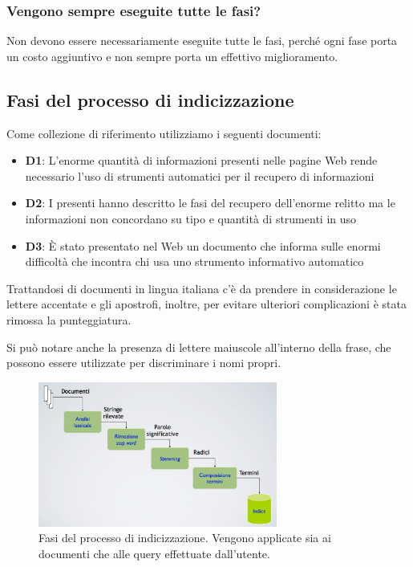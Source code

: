 


\subsubsection{Vengono sempre eseguite tutte le fasi?}

Non devono essere necessariamente eseguite tutte le fasi, perché ogni fase porta un costo aggiuntivo e non sempre porta un effettivo miglioramento.

\subsection{Fasi del processo di indicizzazione}

Come collezione di riferimento utilizziamo i seguenti documenti:

\begin{itemize}
	\item \textbf{D1}: L’enorme quantità di informazioni presenti nelle pagine Web rende necessario l’uso di strumenti automatici per il recupero di informazioni
	\item \textbf{D2}: I presenti hanno descritto le fasi del recupero dell’enorme relitto ma le informazioni non concordano su tipo e quantità di strumenti in uso
	\item \textbf{D3}: \`E stato presentato nel Web un documento che informa sulle enormi difficoltà che incontra chi usa uno strumento informativo automatico
\end{itemize}

Trattandosi di documenti in lingua italiana c'è da prendere in considerazione le lettere accentate e gli apostrofi, inoltre, per evitare ulteriori complicazioni è stata rimossa la punteggiatura.

Si può notare anche la presenza di lettere maiuscole all'interno della frase, che possono essere utilizzate per discriminare i nomi propri.

\begin{figure}[htbp]
\centering
\includegraphics[width=0.7\textwidth]{images/l4-fasi}
\caption{Fasi del processo di indicizzazione. Vengono applicate sia ai documenti che alle query effettuate dall'utente.}
\end{figure}

